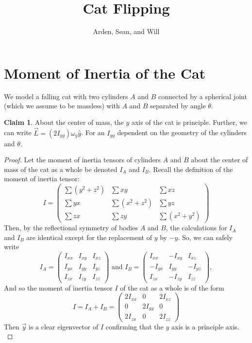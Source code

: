 \documentclass[12]{amsart}
\theoremstyle{definition}
\newtheorem{claim}[theorem]{Claim}
\begin{document}
\title{Cat Flipping}
\author{Arden, Sean, and Will}
\maketitle

\section{Moment of Inertia of the Cat}
We model a falling cat with two cylinders $A$ and $B$ connected by a spherical joint (which we assume to be massless) with $A$ and $B$ separated by angle $\theta$.

\begin{claim}
  About the center of mass, the $y$ axis of the cat is principle. Further, we can write $\vec{L} = (2I_{yy})\omega_y\hat{y}$. For an $I_{yy}$ dependent on the geometry of the cylinders and $\theta$.
\end{claim}
\begin{proof}
  Let the moment of inertia tensors of cylinders $A$ and $B$ about the center of mass of the cat as a whole be denoted $I_A$ and $I_B$. Recall the definition of the moment of inertia tensor:
  \begin{equation*}
    I =
    \begin{pmatrix}
      \sum(y^2+z^2) & \sum xy       & \sum xz     \\
      \sum yx      & \sum(x^2+z^2) & \sum yz      \\
      \sum zx      & \sum zy       & \sum(x^2+y^2)
    \end{pmatrix}
  \end{equation*}
  Then, by the reflectional symmetry of bodies $A$ and $B$, the calculations for $I_A$ and $I_B$ are identical except for the replacement of $y$ by $-y$. So, we can safely write
  \begin{equation*}
    I_A =
    \begin{pmatrix}
      I_{xx} & I_{xy} & I_{xz} \\
      I_{yx} & I_{yy} & I_{yz} \\
      I_{zx} & I_{zy} & I_{zz}
    \end{pmatrix} \text{ and }
    I_B =
    \begin{pmatrix}
      I_{xx} & -I_{xy} & I_{xz} \\
      -I_{yx} & I_{yy} & -I_{yz} \\
      I_{zx} & -I_{zy} & I_{zz}
    \end{pmatrix},
  \end{equation*}
  And so the moment of inertia tensor $I$ of the cat as a whole is of the form
  \begin{equation*}
    I = I_A + I_B =
    \begin{pmatrix}
      2I_{xx} & 0       & 2I_{xz} \\
      0       & 2I_{yy} & 0 \\
      2I_{zx} & 0       & 2I_{zz}
    \end{pmatrix}
  \end{equation*}
  Then $\vec{y}$ is a clear eigenvector of $I$ confirming that the $y$ axis is a principle axis.
  \label{claim:principle}
\end{proof}
\end{document}
